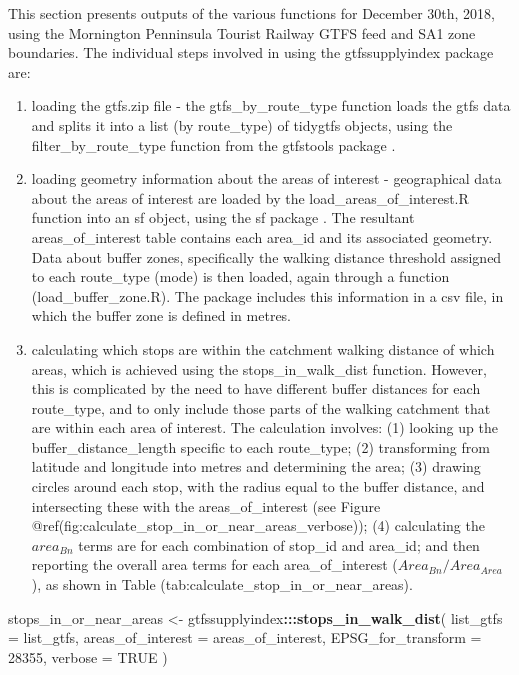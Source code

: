 \documentclass[preprint, 3p,
authoryear]{elsarticle} %
\newenvironment{Shaded}{\begin{snugshade}}{\end{snugshade}}
\newcommand{\AttributeTok}[1]{\textcolor[rgb]{0.13,0.29,0.53}{#1}}
\newcommand{\ConstantTok}[1]{\textcolor[rgb]{0.56,0.35,0.01}{#1}}
\newcommand{\DecValTok}[1]{\textcolor[rgb]{0.00,0.00,0.81}{#1}}
\newcommand{\FunctionTok}[1]{\textcolor[rgb]{0.13,0.29,0.53}{\textbf{#1}}}
\newcommand{\NormalTok}[1]{#1}
\newcommand{\OtherTok}[1]{\textcolor[rgb]{0.56,0.35,0.01}{#1}}
\newcommand{\SpecialCharTok}[1]{\textcolor[rgb]{0.81,0.36,0.00}{\textbf{#1}}}
\begin{document}
This section presents outputs of the various functions for December
30th, 2018, using the Mornington Penninsula Tourist Railway GTFS feed
and SA1 zone boundaries. The individual steps involved in using the
gtfssupplyindex package are:

\begin{enumerate}
\def\labelenumi{(\arabic{enumi})}
\item
  loading the gtfs.zip file - the gtfs\_by\_route\_type function loads
  the gtfs data and splits it into a list (by route\_type) of tidygtfs
  objects, using the filter\_by\_route\_type function from the gtfstools
  package \citep{filter_GTFS_by_mode}.
\item
  loading geometry information about the areas of interest -
  geographical data about the areas of interest are loaded by the
  load\_areas\_of\_interest.R function into an sf object, using the sf
  package \citep{R-sf} . The resultant areas\_of\_interest table
  contains each area\_id and its associated geometry. Data about buffer
  zones, specifically the walking distance threshold assigned to each
  route\_type (mode) is then loaded, again through a function
  (load\_buffer\_zone.R). The package includes this information in a csv
  file, in which the buffer zone is defined in metres.
\item
  calculating which stops are within the catchment walking distance of
  which areas, which is achieved using the stops\_in\_walk\_dist
  function. However, this is complicated by the need to have different
  buffer distances for each route\_type, and to only include those parts
  of the walking catchment that are within each area of interest. The
  calculation involves: (1) looking up the buffer\_distance\_length
  specific to each route\_type; (2) transforming from latitude and
  longitude into metres and determining the area; (3) drawing circles
  around each stop, with the radius equal to the buffer distance, and
  intersecting these with the areas\_of\_interest (see Figure
  @ref(fig:calculate\_stop\_in\_or\_near\_areas\_verbose)); (4)
  calculating the \(area_{Bn}\) terms are for each combination of
  stop\_id and area\_id; and then reporting the overall area terms for
  each area\_of\_interest (\(Area_{Bn} / Area_{Area}\)), as shown in
  Table (tab:calculate\_stop\_in\_or\_near\_areas).
\end{enumerate}

\begin{Shaded}
\begin{Highlighting}[]
\NormalTok{stops\_in\_or\_near\_areas }\OtherTok{\textless{}{-}}\NormalTok{ gtfssupplyindex}\SpecialCharTok{:::}\FunctionTok{stops\_in\_walk\_dist}\NormalTok{(}
  \AttributeTok{list\_gtfs =}\NormalTok{ list\_gtfs, }
  \AttributeTok{areas\_of\_interest =}\NormalTok{ areas\_of\_interest,}
  \AttributeTok{EPSG\_for\_transform =} \DecValTok{28355}\NormalTok{, }
  \AttributeTok{verbose =} \ConstantTok{TRUE}
\NormalTok{)}
\end{Highlighting}
\end{Shaded}
\end{document}
